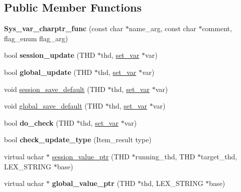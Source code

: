 \subsection*{Public Member Functions}
\begin{DoxyCompactItemize}
\item 
\mbox{\label{classSys__var__charptr__func_a16504e109a2a01c3d5c681eefbdbee35}} 
{\bfseries Sys\+\_\+var\+\_\+charptr\+\_\+func} (const char $\ast$name\+\_\+arg, const char $\ast$comment, flag\+\_\+enum flag\+\_\+arg)
\item 
\mbox{\label{classSys__var__charptr__func_a2d2a3764ebe8cf4917273f78f50f43bd}} 
bool {\bfseries session\+\_\+update} (T\+HD $\ast$thd, \mbox{\hyperlink{classset__var}{set\+\_\+var}} $\ast$var)
\item 
\mbox{\label{classSys__var__charptr__func_a2a7cedd962a5d7cf98de2400e85ee7be}} 
bool {\bfseries global\+\_\+update} (T\+HD $\ast$thd, \mbox{\hyperlink{classset__var}{set\+\_\+var}} $\ast$var)
\item 
void \mbox{\hyperlink{classSys__var__charptr__func_a38ee2df3e1f0168c9ff033738f3b32dc}{session\+\_\+save\+\_\+default}} (T\+HD $\ast$thd, \mbox{\hyperlink{classset__var}{set\+\_\+var}} $\ast$var)
\item 
void \mbox{\hyperlink{classSys__var__charptr__func_abdfe65908bebe29b4345427a6da67213}{global\+\_\+save\+\_\+default}} (T\+HD $\ast$thd, \mbox{\hyperlink{classset__var}{set\+\_\+var}} $\ast$var)
\item 
\mbox{\label{classSys__var__charptr__func_a81339c36d4e5aeeaedfd747960fc9815}} 
bool {\bfseries do\+\_\+check} (T\+HD $\ast$thd, \mbox{\hyperlink{classset__var}{set\+\_\+var}} $\ast$var)
\item 
\mbox{\label{classSys__var__charptr__func_aba36fd0f55144263b379766dc8227a6e}} 
bool {\bfseries check\+\_\+update\+\_\+type} (Item\+\_\+result type)
\item 
virtual uchar $\ast$ \mbox{\hyperlink{classSys__var__charptr__func_a80990cda2c596f6dc20e9b63a2a3cb4b}{session\+\_\+value\+\_\+ptr}} (T\+HD $\ast$running\+\_\+thd, T\+HD $\ast$target\+\_\+thd, L\+E\+X\+\_\+\+S\+T\+R\+I\+NG $\ast$base)
\item 
\mbox{\label{classSys__var__charptr__func_aea411f13d73bb2633b5bb7eeb88f1d8f}} 
virtual uchar $\ast$ {\bfseries global\+\_\+value\+\_\+ptr} (T\+HD $\ast$thd, L\+E\+X\+\_\+\+S\+T\+R\+I\+NG $\ast$base)
\end{DoxyCompactItemize}
